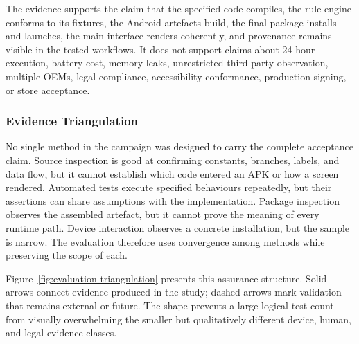 The evidence supports the claim that the specified code compiles, the rule engine conforms to its fixtures, the Android artefacts build, the final package installs and launches, the main interface renders coherently, and provenance remains visible in the tested workflows. It does not support claims about 24-hour execution, battery cost, memory leaks, unrestricted third-party observation, multiple OEMs, legal compliance, accessibility conformance, production signing, or store acceptance.

\subsubsection{Evidence Triangulation}

No single method in the campaign was designed to carry the complete acceptance claim. Source inspection is good at confirming constants, branches, labels, and data flow, but it cannot establish which code entered an APK or how a screen rendered. Automated tests execute specified behaviours repeatedly, but their assertions can share assumptions with the implementation. Package inspection observes the assembled artefact, but it cannot prove the meaning of every runtime path. Device interaction observes a concrete installation, but the sample is narrow. The evaluation therefore uses convergence among methods while preserving the scope of each.

Figure~\ref{fig:evaluation-triangulation} presents this assurance structure. Solid arrows connect evidence produced in the study; dashed arrows mark validation that remains external or future. The shape prevents a large logical test count from visually overwhelming the smaller but qualitatively different device, human, and legal evidence classes.

